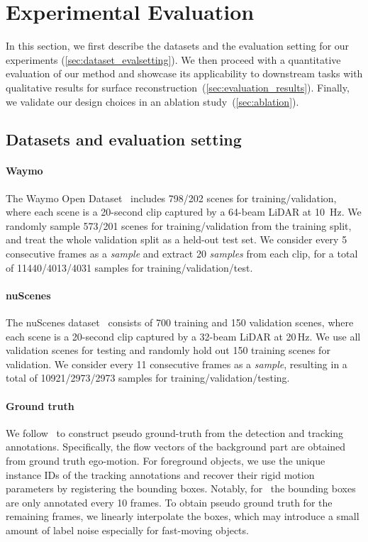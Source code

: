 \section{Experimental Evaluation}
\label{sec:results}
In this section, we first describe the datasets and the evaluation setting for our experiments (\cref{sec:dataset_evalsetting}). We then proceed with a quantitative evaluation of our method and showcase its applicability to downstream tasks with qualitative results for surface reconstruction~(\cref{sec:evaluation_results}). Finally, we validate our design choices in an ablation study~(\cref{sec:ablation}).

\subsection{Datasets and evaluation setting}
\label{sec:dataset_eval}

\paragraph{Waymo} The Waymo Open Dataset~\cite{sun2020scalability} includes 798/202 scenes for training/validation, where each scene is a 20-second clip captured by a 64-beam LiDAR at 10~Hz. We randomly sample 573/201 scenes for training/validation from the training split, and treat the whole validation split as a held-out test set. We consider every 5 consecutive frames as a \textit{sample} and extract 20 \textit{samples} from each clip, for a total of 11440/4013/4031 samples for training/validation/test. %
    
\paragraph{nuScenes} The nuScenes dataset~\cite{caesar2020nuscenes} consists of 700 training and 150 validation scenes, where each scene is a 20-second clip captured by a 32-beam LiDAR at 20$\,$Hz. We use all validation scenes for testing and randomly hold out 150 training scenes for validation. We consider every 11 consecutive frames as a \textit{sample}, resulting in a total of 10921/2973/2973 samples for training/validation/testing.

\paragraph{Ground truth} We follow~\cite{jund2021scalable} to construct pseudo ground-truth from the detection and tracking annotations. Specifically, the flow vectors of the background part are obtained from ground truth ego-motion. For foreground objects, we use the
unique instance IDs of the tracking annotations and recover their rigid motion parameters by registering the bounding boxes.
Notably, for \nuscenes~the bounding boxes are only annotated every 10 frames. To obtain pseudo ground truth for the remaining frames, we linearly interpolate the boxes, which may introduce a small amount of label noise especially for fast-moving objects.

